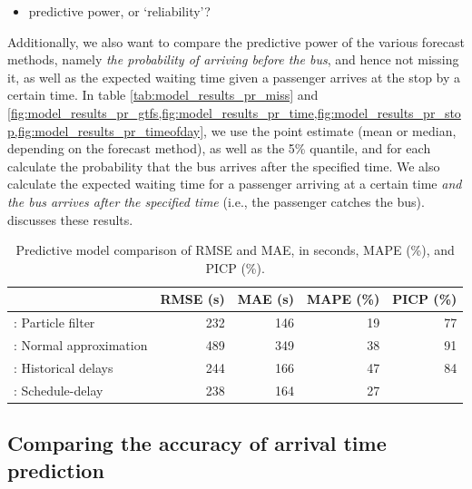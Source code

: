 \begin{itemize}
\item predictive power, or `reliability'?
\end{itemize}

Additionally, we also want to compare the predictive power of the various forecast methods, namely \emph{the probability of arriving before the bus}, and hence not missing it, as well as the expected waiting time given a passenger arrives at the stop by a certain time. In table \cref{tab:model_results_pr_miss} and \cref{fig:model_results_pr_gtfs,fig:model_results_pr_time,fig:model_results_pr_stop,fig:model_results_pr_timeofday}, we use the point estimate (mean or median, depending on the forecast method), as well as the 5\% quantile, and for each calculate the probability that the bus arrives after the specified time. We also calculate the expected waiting time for a passenger arriving at a certain time \emph{and the bus arrives after the specified time} (i.e., the passenger catches the bus).  discusses these results.






\begin{knitrout}\small
{}\color{fgcolor}\begin{table}

\caption{\label{tab:model_results_rmse}Predictive model comparison of RMSE and MAE, in seconds, MAPE (\%), and PICP (\%).}
\centering
\fontsize{8}{10}\selectfont
\begin{tabular}[t]{lrrrr}
\toprule
  & RMSE (s) & MAE (s) & MAPE (\%) & PICP (\%)\\
\midrule
\Fpf{}: Particle filter & 232 & 146 & 19 & 77\\
\Fnorm{}: Normal approximation & 489 & 349 & 38 & 91\\
\Fhist{}: Historical delays & 244 & 166 & 47 & 84\\
\Fsched{}: Schedule-delay & 238 & 164 & 27 & \\
\bottomrule
\end{tabular}
\end{table}


\end{knitrout}




\subsection{Comparing the accuracy of arrival time prediction}
\label{sec:prediction_model_comp_stats}

